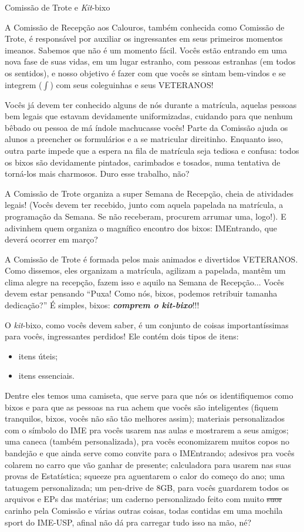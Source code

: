 \begin{secao}{Comissão de Trote e \textit{Kit}-bixo}

A Comissão de Recepção aos Calouros, também conhecida como Comissão de Trote, é
responsável por auxiliar os ingressantes em seus primeiros momentos imeanos.
Sabemos que não é um momento fácil. Vocês estão entrando em uma nova fase de
suas vidas, em um lugar estranho, com pessoas estranhas (em todos os sentidos),
e nosso objetivo é fazer com que vocês se sintam bem-vindos e se integrem
($\int$) com seus coleguinhas e seus VETERANOS!

Vocês já devem ter conhecido alguns de nós durante a matrícula, aquelas pessoas
bem legais que estavam devidamente uniformizadas, cuidando para que nenhum
bêbado ou pessoa de má índole machucasse vocês! Parte da Comissão ajuda os
alunos a preencher os formulários e a se matricular direitinho. Enquanto isso,
outra parte impede que a espera na fila de matrícula seja tediosa e confusa:
todos os bixos são devidamente pintados, carimbados e tosados, numa tentativa
de torná-los mais charmosos. Duro esse trabalho, não?

A Comissão de Trote organiza a super Semana de Recepção, cheia de atividades
legais! (Vocês devem ter recebido, junto com aquela papelada na matrícula, a
programação da Semana. Se não receberam, procurem arrumar uma, logo!).
E adivinhem quem organiza o magnífico encontro dos bixos: IMEntrando, que deverá
ocorrer em março? %

A Comissão de Trote é formada pelos mais animados e divertidos VETERANOS. Como
dissemos, eles organizam a matrícula, agilizam a papelada, mantêm um clima
alegre na recepção, fazem isso e aquilo na Semana de Recepção...
Vocês devem estar pensando ``Puxa! Como nós, bixos, podemos retribuir
tamanha dedicação?'' É simples, bixos: {\bf\em comprem o \textit{kit}-bixo}!!!

O \textit{kit}-bixo, como vocês devem saber, é um conjunto de coisas
importantíssimas para vocês, ingressantes perdidos! Ele contém dois tipos de
itens:
\begin{itemize}
\item itens úteis;
\item itens essenciais.
\end{itemize} %
Dentre eles temos uma camiseta, que serve para que nós os identifiquemos como
bixos e para que as pessoas na rua achem que vocês são inteligentes (fiquem
tranquilos, bixos, vocês não são tão melhores assim); materiais personalizados
com o símbolo do IME pra vocês usarem nas aulas e mostrarem a seus amigos; uma
caneca (também personalizada), pra vocês economizarem muitos copos no bandejão e
que ainda serve como convite para o IMEntrando; adesivos pra vocês colarem no
carro que vão ganhar de presente; calculadora para usarem nas suas provas de
Estatística; squeeze pra aguentarem o calor do começo do ano; uma tatuagem
personalizada; um pen-drive de 8GB, para vocês guardarem todos os arquivos e EPs
das matérias; um caderno personalizado feito com muito \sout{suor} carinho pela
Comissão e várias outras coisas, todas contidas em uma mochila sport do IME-USP,
afinal não dá pra carregar tudo isso na mão, né?


\end{secao}
